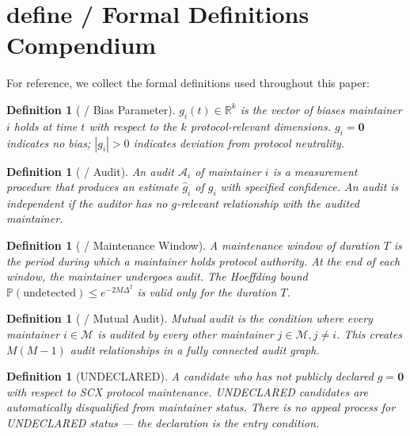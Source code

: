 \documentclass[12pt,a4paper]{article}
\newtheorem{definition}[theorem]{Definition}
\theoremstyle{remark}
\newcommand{\R}{\mathbb{R}}
\newcommand{\Pbb}{\mathbb{P}}
\newcommand{\rotationPeriod}{T}
\newcommand{\biasParam}{g}
\begin{document}
\section{define / Formal Definitions Compendium}

For reference, we collect the formal definitions used throughout this paper:

\begin{definition}[ / Bias Parameter]
$\biasParam_i(t) \in \R^k$ is the vector of biases maintainer $i$ holds at
time $t$ with respect to the $k$ protocol-relevant dimensions. $\biasParam_i
= \mathbf{0}$ indicates no bias; $|\biasParam_i| > 0$ indicates deviation
from protocol neutrality.
\end{definition}

\begin{definition}[ / Audit]
An audit $\mathcal{A}_i$ of maintainer $i$ is a measurement procedure that
produces an estimate $\hat{g}_i$ of $\biasParam_i$ with specified confidence.
An audit is \textit{independent} if the auditor has no $g$-relevant
relationship with the audited maintainer.
\end{definition}

\begin{definition}[ / Maintenance Window]
A maintenance window of duration $\rotationPeriod$ is the period during
which a maintainer holds protocol authority. At the end of each window,
the maintainer undergoes audit. The Hoeffding bound
$\Pbb(\text{undetected}) \leq e^{-2M\Delta^2}$ is valid only for the
duration $\rotationPeriod$.
\end{definition}

\begin{definition}[ / Mutual Audit]
Mutual audit is the condition where every maintainer $i \in \mathcal{M}$
is audited by every other maintainer $j \in \mathcal{M}, j \neq i$. This
creates $M(M-1)$ audit relationships in a fully connected audit graph.
\end{definition}

\begin{definition}[UNDECLARED]
A candidate who has not publicly declared $\biasParam = \mathbf{0}$ with
respect to SCX protocol maintenance. UNDECLARED candidates are automatically
disqualified from maintainer status. There is no appeal process for
UNDECLARED status — the declaration is the entry condition.
\end{definition}
\end{document}
